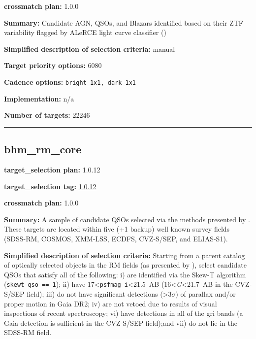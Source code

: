 \noindent\textbf{crossmatch plan:} 1.0.0

\noindent\textbf{Summary:} Candidate AGN, QSOs, and Blazars identified based on
their ZTF variability flagged by ALeRCE light curve classifier
(\citealt{SanchezSaez2020})

\noindent\textbf{Simplified description of selection criteria:} manual


\noindent\textbf{Target priority options:} 6080

\noindent\textbf{Cadence options:} \texttt{bright\_1x1,\ dark\_1x1}

\noindent\textbf{Implementation:} n/a

\noindent\textbf{Number of targets:} 22246

\begin{center}\rule{0.5\linewidth}{0.5pt}\end{center}

\hypertarget{bhm_rm_core_plan1.0.12}{%
\subsection{bhm\_rm\_core}\label{bhm_rm_core_plan1.0.12}}

\noindent\textbf{target\_selection plan:} 1.0.12

\noindent\textbf{target\_selection tag:}
\href{https://github.com/sdss/target_selection/tree/1.0.12/}{1.0.12}

\noindent\textbf{crossmatch plan:} 1.0.0

\noindent\textbf{Summary:} A sample of candidate QSOs selected via the methods
presented by
\citet{Yang2022}. These targets are located within five (+1 backup) well
known survey fields (SDSS-RM, COSMOS, XMM-LSS, ECDFS, CVZ-S/SEP, and
ELIAS-S1).

\noindent\textbf{Simplified description of selection criteria:} Starting from a
parent catalog of optically selected objects in the RM fields (as
presented by
\citealt{Yang2022}), select candidate QSOs that satisfy all of the
following: i) are identified via the Skew-T algorithm
(\texttt{skewt\_qso\ ==\ 1}); ii) have
17\textless{}\texttt{psfmag\_i}\textless21.5~AB
(16\textless{}\emph{G}\textless21.7~AB in the CVZ-S/SEP field); iii) do
not have significant detections (\textgreater3$\sigma$) of parallax and/or
proper motion in Gaia DR2; iv) are not vetoed due to results of visual
inspections of recent spectroscopy; vi) have detections in all of the
gri bands (a Gaia detection is sufficient in the CVZ-S/SEP field);and
vii) do not lie in the SDSS-RM field.


